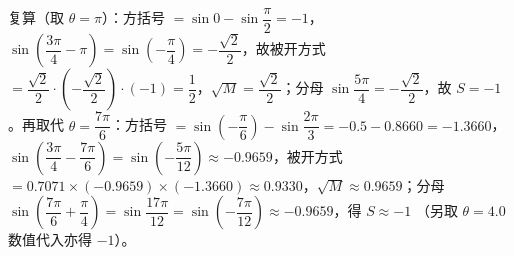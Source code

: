 \begin{answer}
复算（取 $\theta=\pi$）：方括号 $=\sin0-\sin\dfrac{\pi}{2}=-1$，$\sin\left(\dfrac{3\pi}{4}-\pi\right)=\sin\left(-\dfrac{\pi}{4}\right)=-\dfrac{\sqrt2}{2}$，故被开方式 $=\dfrac{\sqrt2}{2}\cdot\left(-\dfrac{\sqrt2}{2}\right)\cdot(-1)=\dfrac12$，$\sqrt M=\dfrac{\sqrt2}{2}$；分母 $\sin\dfrac{5\pi}{4}=-\dfrac{\sqrt2}{2}$，故 $S=-1$ 。再取代 $\theta=\dfrac{7\pi}{6}$：方括号 $=\sin\left(-\dfrac{\pi}{6}\right)-\sin\dfrac{2\pi}{3}=-0.5-0.8660=-1.3660$，$\sin\left(\dfrac{3\pi}{4}-\dfrac{7\pi}{6}\right)=\sin\left(-\dfrac{5\pi}{12}\right)\approx-0.9659$，被开方式 $=0.7071\times(-0.9659)\times(-1.3660)\approx0.9330$，$\sqrt M\approx0.9659$；分母 $\sin\left(\dfrac{7\pi}{6}+\dfrac{\pi}{4}\right)=\sin\dfrac{17\pi}{12}=\sin\left(-\dfrac{7\pi}{12}\right)\approx-0.9659$，得 $S\approx-1$ （另取 $\theta=4.0$ 数值代入亦得 $-1$）。


\end{answer}
